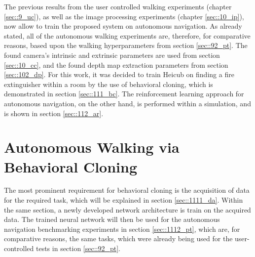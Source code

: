 \FloatBarrier
\label{sec::11_aw}
The previous results from the user controlled walking experiments (chapter \ref{sec::9_uc}), as well as the image processing experiments (chapter \ref{sec::10_ip}), now allow to train the proposed system on autonomous navigation. As already stated, all of the autonomous walking experiments are, therefore, for comparative reasons, based upon the walking hyperparameters from section \ref{sec::92_pt}. The found camera's intrinsic and extrinsic parameters are used from section \ref{sec::10_cc}, and the found depth map extraction parameters from section \ref{sec::102_dp}. For this work, it was decided to train Heicub on finding a fire extinguisher within a room by the use of behavioral cloning, which is demonstrated in section \ref{sec::111_bc}. The reinforcement learning approach for autonomous navigation, on the other hand, is performed within a simulation, and is shown in section \ref{sec::112_ar}. 
\section{Autonomous Walking via Behavioral Cloning}
\FloatBarrier
\label{sec::111_bc}
The most prominent requirement for behavioral cloning is the acquisition of data for the required task, which will be explained in section \ref{sec::1111_da}. Within the same section, a newly developed network architecture is train on the acquired data. The trained neural network will then be used for the autonomous navigation benchmarking experiments in section \ref{sec::1112_pt}, which are, for comparative reasons, the same tasks, which were already being used for the user-controlled tests in section \ref{sec::92_pt}. 
